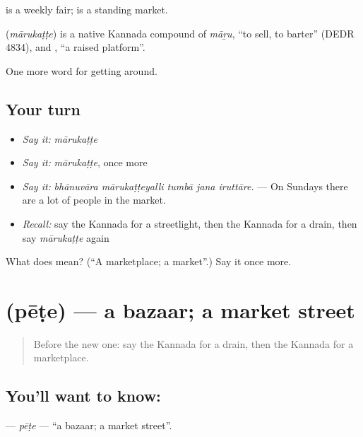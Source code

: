  is a weekly fair;  is a standing market.

\begin{cousinweb}
\textbf{} (\emph{mārukaṭṭe}) is a native Kannada compound of \emph{māṟu}, \textquotedblleft{}to sell, to barter\textquotedblright{} (DEDR 4834), and , \textquotedblleft{}a raised platform\textquotedblright{}.
\end{cousinweb}

\begin{grammarlens}[title={What you've built}]
One more word for getting around.
\end{grammarlens}

\subsection*{Your turn}
\begin{itemize}
\raggedright
  \item \emph{Say it:} \emph{mārukaṭṭe}
  \item \emph{Say it:} \emph{mārukaṭṭe}, once more
  \item \emph{Say it:} \emph{bhānuvāra mārukaṭṭeyalli tumbā jana iruttāre.} — On Sundays there are a lot of people in the market.
  \item \emph{Recall:} say the Kannada for a streetlight, then the Kannada for a drain, then say \emph{mārukaṭṭe} again
\end{itemize}

\begin{tcolorbox}[breakable,colback=teal!4,colframe=teal!35!black,title={Before you move on}]
What does  mean? (\textquotedblleft{}A marketplace; a market\textquotedblright{}.) Say it once more.
\end{tcolorbox}
\section[\texorpdfstring{\kn{ಪೇಟೆ} (pēṭe)}{ಪೇಟೆ (pēṭe)}]{ (pēṭe) — a bazaar; a market street}

\label{lesson:KA-C467-pete}



\begin{quote}
Before the new one: say the Kannada for a drain, then the Kannada for a marketplace.
\end{quote}

\subsection*{You'll want to know: }
\textbf{} — \emph{pēṭe} — \textquotedblleft{}a bazaar; a market street\textquotedblright{}.


